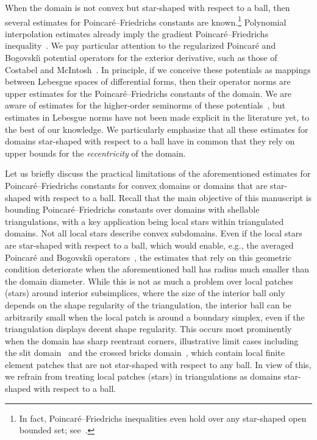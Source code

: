 \documentclass[10pt,a4paper]{article}
\begin{document}
When the domain is not convex but star-shaped with respect to a ball,
then several estimates for Poincar\'e--Friedrichs constants are known.\footnote{In fact, Poincar\'e--Friedrichs inequalities even hold over any star-shaped open bounded set; see~\cite[Theorem~3.1]{hurri1988poincare}.}
Polynomial interpolation estimates already imply the gradient Poincar\'e--Friedrichs inequality~\cite{brenner2008mathematical,ern2021finite}.
We pay particular attention to the regularized Poincar\'e and Bogovski\u{\i} potential operators for the exterior derivative,
such as those of Costabel and McIntosh~\cite{costabel2010bogovskiui}.
In principle, if we conceive these potentials as mappings between Lebesgue spaces of differential forms, then their operator norms are upper estimates for the Poincar\'e--Friedrichs constants of the domain.
We are aware of estimates for the higher-order seminorms of these potentials~\cite{guzman2021estimation},
but estimates in Lebesgue norms have not been made explicit in the literature yet, to the best of our knowledge.
We particularly emphasize that all these estimates for domains star-shaped with respect to a ball have in common that they rely on upper bounds for the \emph{eccentricity} of the domain.


Let us briefly discuss the practical limitations of the aforementioned estimates for Poincar\'e--Friedrichs constants for convex domains or domains that are star-shaped with respect to a ball.
Recall that the main objective of this manuscript is bounding Poincar\'e--Friedrichs constants over domains with shellable triangulations, with a key application being local stars within triangulated domains.
Not all local stars describe convex subdomains.
Even if the local stars are star-shaped with respect to a ball,
which would enable, e.g., the averaged Poincar\'e and Bogovski\u{\i} operators~\cite{costabel2010bogovskiui},
the estimates that rely on this geometric condition deteriorate when the aforementioned ball has radius much smaller than the domain diameter.
While this is not as much a problem over local patches (stars) around interior subsimplices, where the size of the interior ball only depends on the shape regularity of the triangulation, the interior ball can be arbitrarily small when the local patch is around a boundary simplex, even if the triangulation displays decent shape regularity.
This occurs most prominently when the domain has sharp reentrant corners, illustrative limit cases including the slit domain~\cite{veeser2012poincare} and the crossed bricks domain~\cite{licht2019smoothed},
which contain local finite element patches that are not star-shaped with respect to any ball.
In view of this, we refrain from treating local patches (stars) in triangulations as domains star-shaped with respect to a ball.
\end{document}
